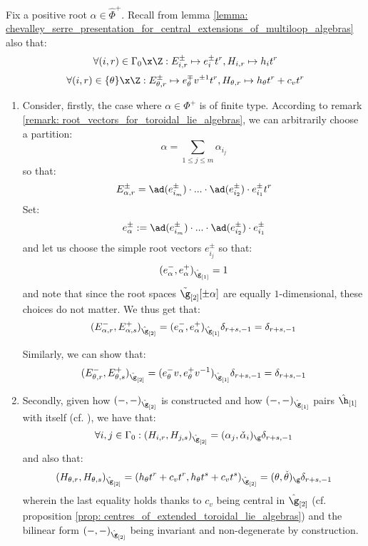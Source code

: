         \begin{remark} \label{remark: pairing_positive_and_negative_root_spaces_in_toroidal_lie_algebras}
            Fix a positive root $\alpha \in \hat{\Phi}^+$. Recall from lemma \ref{lemma: chevalley_serre_presentation_for_central_extensions_of_multiloop_algebras} also that:
                $$\forall (i, r) \in \Gamma_0 \x \Z: E_{i, r}^{\pm} \mapsto e_i^{\pm} t^r, H_{i, r} \mapsto h_i t^r$$
                $$\forall (i, r) \in \{\theta\} \x \Z: E_{\theta, r}^{\pm} \mapsto e_{\theta}^{\mp} v^{\pm 1} t^r, H_{\theta, r} \mapsto h_{\theta} t^r + c_v t^r$$
            \begin{enumerate}
                \item Consider, firstly, the case where $\alpha \in \Phi^+$ is of finite type. According to remark \ref{remark: root_vectors_for_toroidal_lie_algebras}, we can arbitrarily choose a partition:
                    $$\alpha = \sum_{1 \leq j \leq m} \alpha_{i_j}$$
                so that:
                    $$E_{\alpha, r}^{\pm} = \ad(e_{i_m}^{\pm}) \cdot ... \cdot \ad(e_{i_2}^{\pm}) \cdot e_{i_1}^{\pm} t^r$$
                Set:
                    $$e_{\alpha}^{\pm} := \ad(e_{i_m}^{\pm}) \cdot ... \cdot \ad(e_{i_2}^{\pm}) \cdot e_{i_1}^{\pm}$$
                and let us choose the simple root vectors $e_{i_j}^{\pm}$ so that:
                    $$(e_{\alpha}^-, e_{\alpha}^+)_{\hat{\g}_{[1]}} = 1$$
                and note that since the root spaces $\tilde{\g}_{[2]}[\pm\alpha]$ are equally $1$-dimensional, these choices do not matter. We thus get that:
                    $$(E_{\alpha, r}^-, E_{\alpha, s}^+)_{\hat{\g}_{[2]}} = (e_{\alpha}^-, e_{\alpha}^+)_{\hat{\g}_{[1]}} \delta_{r + s, -1} = \delta_{r + s, -1}$$

                Similarly, we can show that:
                    $$(E_{\theta, r}^-, E_{\theta, s}^+)_{\hat{\g}_{[2]}} = (e_{\theta}^- v, e_{\theta}^+ v^{-1})_{\hat{\g}_{[1]}} \delta_{r + s, -1} = \delta_{r + s, -1}$$
                \item Secondly, given how $(-, -)_{\hat{\g}_{[2]}}$ is constructed and how $(-, -)_{\hat{\g}_{[1]}}$ pairs $\hat{\h}_{[1]}$ with itself (cf. \cite[Chapter 2]{kac_infinite_dimensional_lie_algebras}), we have that:
                    $$\forall i,j \in \Gamma_0: (H_{i, r}, H_{j, s})_{\hat{\g}_{[2]}} = (\alpha_j, \check{\alpha}_i)_{\g} \delta_{r + s, -1}$$
                and also that:
                    $$(H_{\theta, r}, H_{\theta, s})_{\hat{\g}_{[2]}} = (h_{\theta} t^r + c_v t^r, h_{\theta} t^s + c_v t^s)_{\hat{\g}_{[2]}} = (\theta, \check{\theta})_{\g} \delta_{r + s, -1}$$
                wherein the last equality holds thanks to $c_v$ being central in $\hat{\g}_{[2]}$ (cf. proposition \ref{prop: centres_of_extended_toroidal_lie_algebras}) and the bilinear form $(-, -)_{\hat{\g}_{[2]}}$ being invariant and non-degenerate by construction. 


\end{enumerate}
\end{remark}
